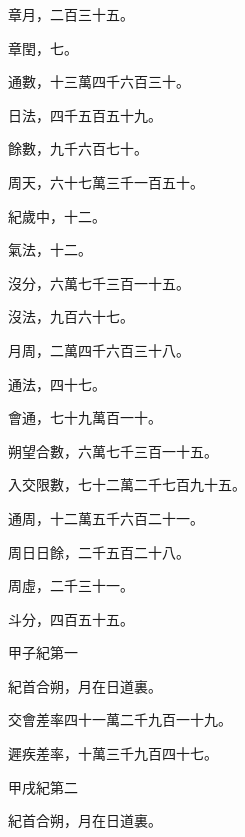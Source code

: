 \begin{pinyinscope}
 章月，二百三十五。



 章閏，七。



 通數，十三萬四千六百三十。



 日法，四千五百五十九。



 餘數，九千六百七十。



 周天，六十七萬三千一百五十。



 紀歲中，十二。



 氣法，十二。



 沒分，六萬七千三百一十五。



 沒法，九百六十七。



 月周，二萬四千六百三十八。



 通法，四十七。



 會通，七十九萬百一十。



 朔望合數，六萬七千三百一十五。



 入交限數，七十二萬二千七百九十五。



 通周，十二萬五千六百二十一。



 周日日餘，二千五百二十八。



 周虛，二千三十一。



 斗分，四百五十五。



 甲子紀第一



 紀首合朔，月在日道裏。



 交會差率四十一萬二千九百一十九。



 遲疾差率，十萬三千九百四十七。



 甲戌紀第二



 紀首合朔，月在日道裏。




\end{pinyinscope}
